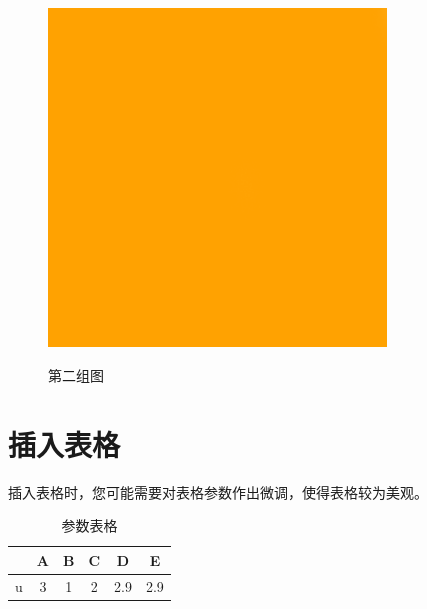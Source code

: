 \begin{figure}[h]
\begin{minipage}[t]{0.5\textwidth}
{    \includegraphics[width=0.8\textwidth]
        {pic/example.png}
  }\\
  \caption{第二组图}
\end{minipage}
\end{figure}

\clearpage

\section{插入表格}
插入表格时，您可能需要对表格参数作出微调，使得表格较为美观。
\begin{table}[h]
\setlength{\tabcolsep}{5mm}%
\caption{参数表格}\label{tab:参数表格}
  \centering
\begin{tabular}{|c|c|c|c|c|c|}
  \hline
    & A & B & C & D & E \\\hline
  u & 3 & 1 & 2 & 2.9 & 2.9 \\\hline
\end{tabular}
\end{table}

